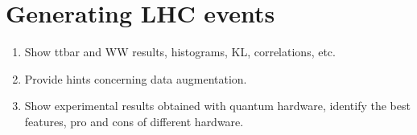 \documentclass[twocolumn,preprintnumbers,superscriptaddress]{revtex4-2}
\begin{document}
\section{Generating LHC events}
\label{sec:lhc}

\begin{enumerate}
  \item Show ttbar and WW results, histograms, KL, correlations, etc.
  \item Provide hints concerning data augmentation.
  \item Show experimental results obtained with quantum hardware, identify the
        best features, pro and cons of different hardware.
\end{enumerate}



\end{document}
